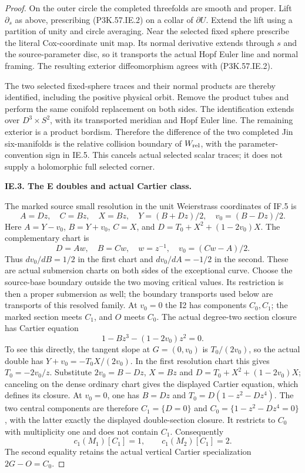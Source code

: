 \begin{proof}
On the outer circle the completed threefolds are smooth
and proper. Lift \(\partial_s\) as above, prescribing
(P3K.57.IE.2) on a collar of \(\partial U\). Extend the lift
using a partition of unity and circle averaging.
Near the selected fixed sphere prescribe the literal
Cox-coordinate unit map. Its normal derivative extends
through \(s\) and the source-parameter disc, so it
transports the actual Hopf Euler line and normal
framing. The resulting exterior diffeomorphism agrees
with (P3K.57.IE.2).

The two selected fixed-sphere traces and their normal
products are thereby identified, including the positive
physical orbit. Remove the product tubes and perform
the same conifold replacement on both sides. The
identification extends over \(D^3\times S^2\), with
its transported meridian and Hopf Euler line. The
remaining exterior is a product bordism. Therefore
the difference of the two completed Jin six-manifolds
is the relative collision boundary of \(W_{\rm rel}\),
with the parameter-convention sign in IE.5.
This cancels actual selected scalar traces; it does
not supply a holomorphic full selected corner.

\par\medskip\noindent\textbf{IE.3. The E doubles and actual Cartier class.}\par\nopagebreak[4]

The marked source small resolution in the unit
Weierstrass coordinates of IF.5 is
\[
 A=Dz,\quad C=Bz,\quad X=Bz,\quad
 Y=(B+Dz)/2,\quad v_0=(B-Dz)/2 .
\]
Here \(A=Y-v_0\), \(B=Y+v_0\), \(C=X\), and
\(D=T_0+X^2+(1-2v_0)X\). The complementary chart is
\[
 D=Aw,\quad B=Cw,\quad w=z^{-1},\quad
 v_0=(Cw-A)/2.
\]
Thus \(dv_0/dB=1/2\) in the first chart and
\(dv_0/dA=-1/2\) in the second. These are actual
submersion charts on both sides of the exceptional
curve. Choose the source-base boundary outside the
two moving critical values. Its restriction is then
a proper submersion as well; the boundary transports
used below are transports of this resolved family.
At \(v_0=0\) the I2 has components \(C_0,C_1\);
the marked section meets \(C_1\), and \(O\) meets
\(C_0\). The actual degree-two section closure has
Cartier equation
\[
                  1-Bz^3-(1-2v_0)z^2=0 .
\]
To see this directly, the tangent slope at
\(G=(0,v_0)\) is \(T_0/(2v_0)\), so the actual
double has \(Y+v_0=-T_0X/(2v_0)\). In the first
resolution chart this gives \(T_0=-2v_0/z\).
Substitute \(2v_0=B-Dz\), \(X=Bz\) and
\(D=T_0+X^2+(1-2v_0)X\); canceling on the dense
ordinary chart gives the displayed Cartier equation,
which defines its closure. At \(v_0=0\), one has
\(B=Dz\) and
\(T_0=D(1-z^2-Dz^4)\). The two central components
are therefore \(C_1=\{D=0\}\) and
\(C_0=\{1-z^2-Dz^4=0\}\), with the latter exactly
the displayed double-section closure.
It restricts to \(C_0\) with multiplicity one and
does not contain \(C_1\). Consequently
\[
 c_1(M_1)[C_1]=1,\qquad c_1(M_2)[C_1]=2.               \tag{P3K.57.IE.3}
\]
The second equality retains the actual vertical
Cartier specialization \(2G-O=C_0\).


\end{proof}

